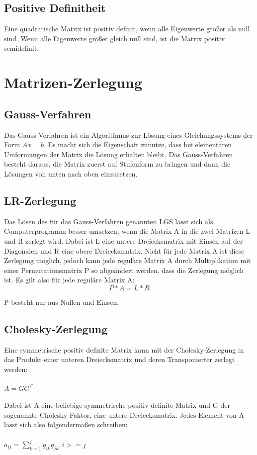 \documentclass[11pt]{scrreprt}
\begin{document}
\subsection{Positive Definitheit}
Eine quadratische Matrix ist positiv definit, wenn alle Eigenwerte größer als null sind. Wenn alle Eigenwerte größer gleich null sind, ist die Matrix positiv semidefinit.


\section{Matrizen-Zerlegung}
\subsection{Gauss-Verfahren}

Das Gauss-Verfahren ist ein Algorithmus zur Lösung eines Gleichungssystems der Form $Ax=b$. Es macht sich die Eigenschaft zunutze, dass bei elementaren Umformungen der Matrix die Lösung erhalten bleibt. Das Gauss-Verfahren besteht daraus, die Matrix zuerst auf Stufenform zu bringen und dann die Lösungen von unten nach oben einzusetzen.

\subsection{LR-Zerlegung}

Das Lösen des für das Gauss-Verfahren genannten LGS lässt sich als Computerprogramm besser umsetzen, wenn die Matrix A in die zwei Matrizen L und R zerlegt wird. Dabei ist L eine untere Dreiecksmatrix mit Einsen auf der Diagonalen und R eine obere Dreiecksmatrix. Nicht für jede Matrix A ist diese Zerlegung möglich, jedoch kann jede reguläre Matrix A durch Multiplikation mit einer Permutationsmatrix P so abgeändert werden, dass die Zerlegung möglich ist. Es gilt also für jede reguläre Matrix A:
\begin{equation}
P * A = L * R
\end{equation}

P besteht nur aus Nullen und Einsen.


\subsection{Cholesky-Zerlegung}

Eine symmetrische positiv definite Matrix kann mit der Cholesky-Zerlegung in das Produkt einer unteren Dreiecksmatrix und deren Transponierter zerlegt werden: \\
\\
$A = GG^T$ \\
\\
Dabei ist A eine beliebige symmetrische positiv definite Matrix und G der sogenannte Cholesky-Faktor, eine untere Dreiecksmatrix. Jedes Element von A lässt sich  also folgendermaßen schreiben: \\
\\
$a_{ij} =\sum\nolimits_{k=1}^j g_{ik}g_{jk} , i >= j$ \\
\end{document}
